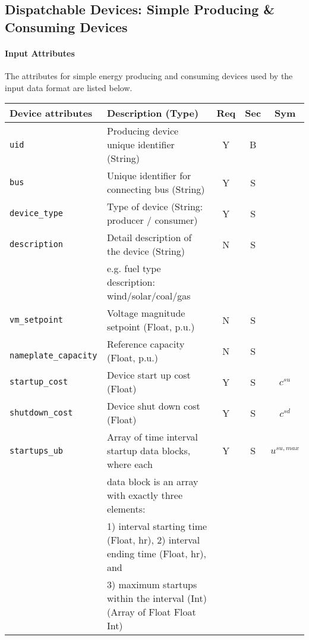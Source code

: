 \documentclass{article}
\begin{document}
\subsection{Dispatchable Devices: Simple Producing \& Consuming Devices}
\label{nom:gen_single}
\paragraph{Input Attributes} The attributes for
simple energy producing and consuming devices used by the input data format are listed below.
\begin{center}
\small
\begin{tabular}{ l | l | c | c | c |}
Device attributes & Description (Type) & Req & Sec & Sym\\
\hline
  {\tt uid} & Producing device unique identifier (String) & Y & B &  \\
  {\tt bus} & Unique identifier for connecting bus (String)& Y & S & \\
  {\tt device\_type} & Type of device (String: producer / consumer) & Y & S & \\
  {\tt description} & Detail description of the device  (String) & N & S & \\
      &e.g. fuel type description: wind/solar/coal/gas  &  &  & \\
  {\tt vm\_setpoint} & Voltage magnitude setpoint (Float, p.u.) & N & S & \\
  {\tt\color{red} nameplate\_capacity} & Reference capacity (Float, p.u.) & N & S & \\
  {\tt startup\_cost} & Device start up cost (Float) & Y & S & $c^{su}$\\
  {\tt shutdown\_cost} & Device shut down cost (Float) & Y & S & $c^{sd}$\\
  {\tt startups\_ub} & Array of time interval startup data blocks, where each & Y & S & $u^{su,max}$\\
                     & data block is an array with exactly three elements: &   &   & \\
                     & 1) interval starting time (Float, hr), 2) interval ending time (Float, hr), and &   &   & \\
                     & 3) maximum startups within the interval (Int) (Array of Float Float Int) &   &   & \\


\end{tabular}
\end{center}
\end{document}
